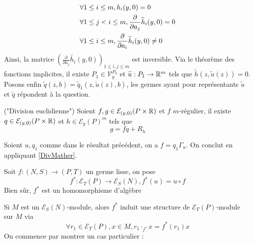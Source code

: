 \documentclass[memoire.tex]{subfiles}
\begin{document}
\begin{preuve}
    \begin{align*}
        &\forall 1\leq i\leq m,\space  h_i(y,0)=0\\
        &\forall 1\leq j<i\leq m,\space \frac{\partial }{\partial a_j}\tilde{h}_i(y,0)=0\\
        &\forall 1\leq i\leq m,\space \frac{\partial }{\partial a_i}\tilde{h}_i(y,0)\neq 0
    \end{align*}
    Ainsi, la matrice $(\frac{\partial}{\partial a_j}\tilde{h_i}(y,0))_{1\leq i,j\leq m}$ est inversible. Via le théorème des fonctions implicites, il existe $P_1\in\mathcal{V}^{P_0}_{y}$ et  $\tilde{u}:P_1\rightarrow \R^m$ tels que $\tilde{h}(z,\tilde{u}(z))=0$. Posons enfin $\tilde{q}(z,b)=\tilde{q}_1(z,\tilde{u}(z),b)$, les germes ayant pour représentants $\tilde{u}$ et $\tilde{q}$ répondent à la question.
\end{preuve}


\begin{corollaire}\label{ThmDIV}("Division euclidienne")
    Soient $f,g\in\mathcal{E}_{(y,0)}(P\times\R)$ et $f$ $m$-régulier, il existe $q\in\mathcal{E}_{(y,0)}(P\times\R)$ et $h\in\mathcal{E}_{y}(P)^m$ tels que 
    \begin{equation*}
        g=fq+R_h
    \end{equation*}
\end{corollaire}
\begin{preuve}
    Soient $u,q_1$ comme dans le résultat précédent, on a $f=q_1\Gamma_u$. On conclut en appliquant \ref{DivMather}.\\
\end{preuve}

\begin{definition}
    Soit $f:(N,S)\rightarrow (P,T)$ un germe  lisse, on pose
    \begin{equation*}
        f^*: \mathcal{E}_T(P)\rightarrow \mathcal{E}_S(N), f^{*}(u)=u\circ f
    \end{equation*}
    Bien sûr, $f^{*}$ est un homomorphisme d'algèbre 
\end{definition}
Si $M$ est un $\mathcal{E}_S(N)$-module, alors $f^{*}$ induit une structure de $\mathcal{E}_T(P)$-module sur $M$
via 
\begin{equation*}
    \forall r_1\in\mathcal{E}_T(P),x\in M, r_1\cdot_{f^*} x=f^{*}(r_1)x
\end{equation*}
On commence par montrer un cas particulier :
\end{document}
